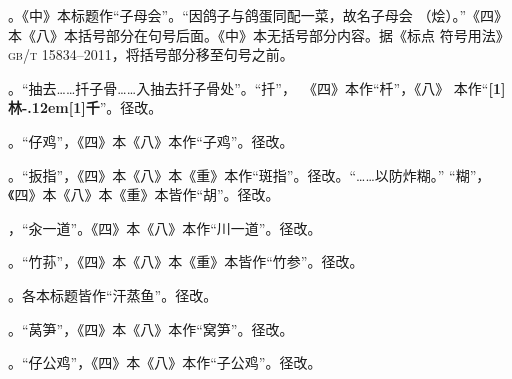 。《中》本标题作“子母会”。“因鸽子与鸽蛋同配一菜，故名子母会
（烩）。”《四》本《八》本括号部分在句号后面。《中》本无括号部分内容。据《标点
符号用法》\textsc{gb/t 15834--2011}，将括号部分移至句号之前。

。“抽去……扦子骨……入抽去扦子骨处”。“扦”，~《四》本作“杄”，《八》
本作“{\bfseries\scalebox{.65}[1]{林}\kern-.12em\scalebox{.55}[1]{千}}”。径改。

。“仔鸡”，《四》本《八》本作“子鸡”。径改。

。“扳指”，《四》本《八》本《重》本作“斑指”。径改。“……以防炸糊。”
“糊”，《四》本《八》本《重》本皆作“胡”。径改。

，“汆一道”。《四》本《八》本作“川一道”。径改。

。“竹荪”，《四》本《八》本《重》本皆作“竹参”。径改。

。各本标题皆作“汗蒸鱼”。径改。

。“莴笋”，《四》本《八》本作“窝笋”。径改。

。“仔公鸡”，《四》本《八》本作“子公鸡”。径改。

\endgroup%

